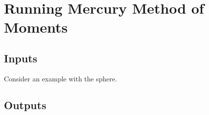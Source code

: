 % 

\section{Running Mercury Method of Moments}

\subsection{Inputs}
Consider an example with the sphere.



{\scriptsize{

}}

{\scriptsize{

}}

\subsection{Outputs}
	
	

\endinput  %

	

